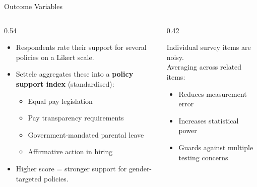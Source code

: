 \documentclass[aspectratio=169, 11pt]{beamer}
\begin{document}
\begin{frame}[t]{Outcome Variables}
\begin{columns}[T]
\begin{column}{0.54\textwidth}
\begin{itemize}
  \setlength\itemsep{0.4em}
  \item Respondents rate their support for several policies on a Likert scale.
  \item Settele aggregates these into a \textbf{policy support index} (standardised):
  \begin{itemize}
    \setlength\itemsep{0.25em}
    \item Equal pay legislation
    \item Pay transparency requirements
    \item Government-mandated parental leave
    \item Affirmative action in hiring
  \end{itemize}
  \item Higher score = stronger support for gender-targeted policies.
\end{itemize}
\end{column}
\begin{column}{0.42\textwidth}
\begin{keybox}
Individual survey items are noisy.\\[0.2em]
Averaging across related items:
\begin{itemize}
  \setlength\itemsep{0.25em}
  \item Reduces measurement error
  \item Increases statistical power
  \item Guards against multiple testing concerns
\end{itemize}
\vspace{0.3em}
\end{keybox}
\end{column}
\end{columns}
\end{frame}

\end{document}
